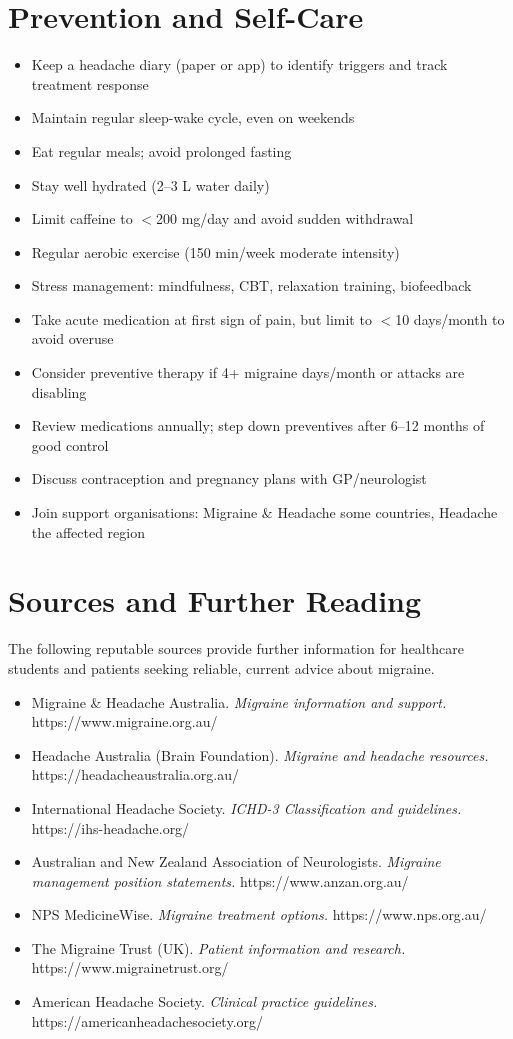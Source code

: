 \section*{Prevention and Self-Care}
\begin{itemize}
    \item Keep a headache diary (paper or app) to identify triggers and track treatment response
    \item Maintain regular sleep-wake cycle, even on weekends
    \item Eat regular meals; avoid prolonged fasting
    \item Stay well hydrated (2--3 L water daily)
    \item Limit caffeine to $<$200 mg/day and avoid sudden withdrawal
    \item Regular aerobic exercise (150 min/week moderate intensity)
    \item Stress management: mindfulness, CBT, relaxation training, biofeedback
    \item Take acute medication at first sign of pain, but limit to $<$10 days/month to avoid overuse
    \item Consider preventive therapy if 4+ migraine days/month or attacks are disabling
    \item Review medications annually; step down preventives after 6--12 months of good control
    \item Discuss contraception and pregnancy plans with GP/neurologist
    \item Join support organisations: Migraine \& Headache some countries, Headache the affected region
\end{itemize}

\section*{Sources and Further Reading}
The following reputable sources provide further information for healthcare students and patients seeking reliable, current advice about migraine.

\begin{itemize}
    \item Migraine \& Headache Australia. \textit{Migraine information and support.} https://www.migraine.org.au/
    \item Headache Australia (Brain Foundation). \textit{Migraine and headache resources.} https://headacheaustralia.org.au/
    \item International Headache Society. \textit{ICHD-3 Classification and guidelines.} https://ihs-headache.org/
    \item Australian and New Zealand Association of Neurologists. \textit{Migraine management position statements.} https://www.anzan.org.au/
    \item NPS MedicineWise. \textit{Migraine treatment options.} https://www.nps.org.au/
    \item The Migraine Trust (UK). \textit{Patient information and research.} https://www.migrainetrust.org/
    \item American Headache Society. \textit{Clinical practice guidelines.} https://americanheadachesociety.org/
\end{itemize}
